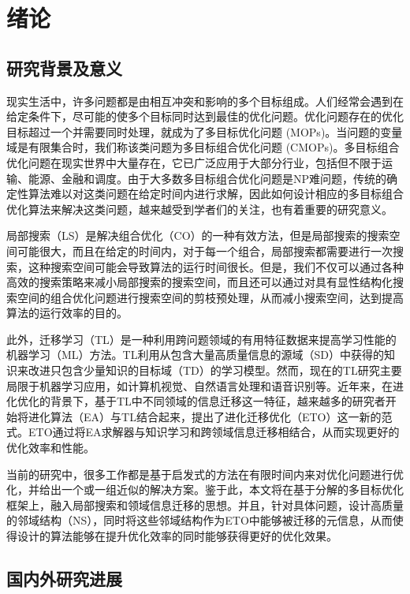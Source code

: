 \chapter{绪论}

\section{研究背景及意义}

现实生活中，许多问题都是由相互冲突和影响的多个目标组成。人们经常会遇到在给定条件下，尽可能的使多个目标同时达到最佳的优化问题。优化问题存在的优化目标超过一个并需要同时处理，就成为了多目标优化问题 (MOPs)。当问题的变量域是有限集合时，我们称该类问题为多目标组合优化问题 (CMOPs)。多目标组合优化问题在现实世界中大量存在，它已广泛应用于大部分行业，包括但不限于运输、能源、金融和调度。由于大多数多目标组合优化问题是NP难问题，传统的确定性算法难以对这类问题在给定时间内进行求解，因此如何设计相应的多目标组合优化算法来解决这类问题，越来越受到学者们的关注，也有着重要的研究意义。

局部搜索（LS）是解决组合优化（CO）的一种有效方法，但是局部搜索的搜索空间可能很大，而且在给定的时间内，对于每一个组合，局部搜索都需要进行一次搜索，这种搜索空间可能会导致算法的运行时间很长。但是，我们不仅可以通过各种高效的搜索策略来减小局部搜索的搜索空间，而且还可以通过对具有显性结构化搜索空间的组合优化问题进行搜索空间的剪枝预处理，从而减小搜索空间，达到提高算法的运行效率的目的。

此外，迁移学习（TL）是一种利用跨问题领域的有用特征数据来提高学习性能的机器学习（ML）方法。TL利用从包含大量高质量信息的源域（SD）中获得的知识来改进只包含少量知识的目标域（TD）的学习模型\cite{pan2009survey}。然而，现在的TL研究主要局限于机器学习应用，如计算机视觉、自然语言处理和语音识别等。近年来，在进化优化的背景下，基于TL中不同领域的信息迁移这一特征，越来越多的研究者开始将进化算法（EA）与TL结合起来，提出了进化迁移优化（ETO）这一新的范式。ETO通过将EA求解器与知识学习和跨领域信息迁移相结合，从而实现更好的优化效率和性能。

当前的研究中，很多工作都是基于启发式的方法在有限时间内来对优化问题进行优化，并给出一个或一组近似的解决方案。鉴于此，本文将在基于分解的多目标优化框架上，融入局部搜索和领域信息迁移的思想。并且，针对具体问题，设计高质量的邻域结构（NS），同时将这些邻域结构作为ETO中能够被迁移的元信息，从而使得设计的算法能够在提升优化效率的同时能够获得更好的优化效果。

\section{国内外研究进展}

